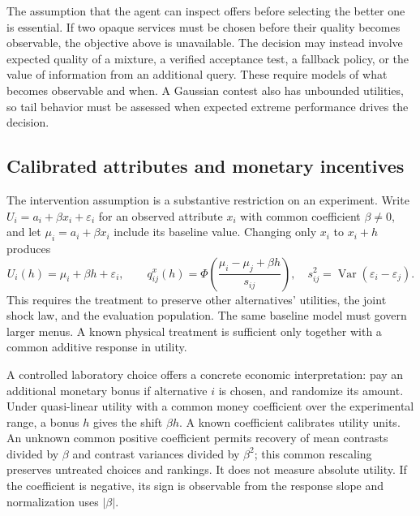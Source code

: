 \documentclass[11pt]{amsart}
\theoremstyle{definition}
\begin{document}
\begin{table}[ht]
\centering
\caption{All two-provider inquiry values for \eqref{eq:provider_data}. The common inquiry charge is $0.24$ per pair.}\label{tab:inquiry}

\end{table}

The assumption that the agent can inspect offers before selecting the better one is essential. If two opaque services must be chosen before their quality becomes observable, the objective above is unavailable. The decision may instead involve expected quality of a mixture, a verified acceptance test, a fallback policy, or the value of information from an additional query. These require models of what becomes observable and when. A Gaussian contest also has unbounded utilities, so tail behavior must be assessed when expected extreme performance drives the decision.

\subsection{Calibrated attributes and monetary incentives}\label{subsec:calibration}
The intervention assumption is a substantive restriction on an experiment. Write $U_i=a_i+\beta x_i+\varepsilon_i$ for an observed attribute $x_i$ with common coefficient $\beta\ne0$, and let $\mu_i=a_i+\beta x_i$ include its baseline value. Changing only $x_i$ to $x_i+h$ produces
\begin{equation}\label{eq:attribute}
 U_i(h)=\mu_i+\beta h+\varepsilon_i,\qquad
 q^x_{ij}(h)=\Phi\left(\frac{\mu_i-\mu_j+\beta h}{s_{ij}}\right),
 \quad s_{ij}^2=\operatorname{Var}(\varepsilon_i-\varepsilon_j).
\end{equation}
This requires the treatment to preserve other alternatives' utilities, the joint shock law, and the evaluation population. The same baseline model must govern larger menus. A known physical treatment is sufficient only together with a common additive response in utility.

A controlled laboratory choice offers a concrete economic interpretation: pay an additional monetary bonus if alternative $i$ is chosen, and randomize its amount. Under quasi-linear utility with a common money coefficient over the experimental range, a bonus $h$ gives the shift $\beta h$. A known coefficient calibrates utility units. An unknown common positive coefficient permits recovery of mean contrasts divided by $\beta$ and contrast variances divided by $\beta^2$; this common rescaling preserves untreated choices and rankings. It does not measure absolute utility. If the coefficient is negative, its sign is observable from the response slope and normalization uses $|\beta|$.
\end{document}
